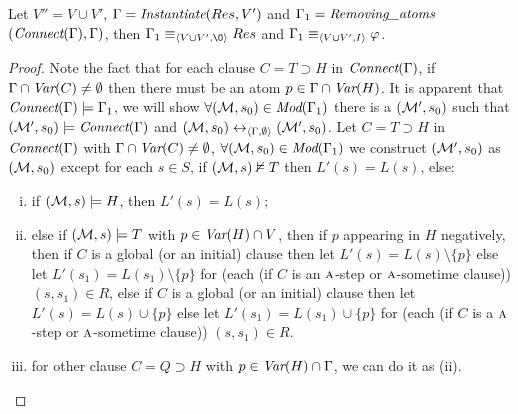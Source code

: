 \documentclass[letterpaper]{article} %
\begin{document}
\begin{proposition}\label{pro:elm}
Let $V''=V \cup V'$, $\Gamma=\emph{Instantiate}(Res, V')$ and $\Gamma_1=\emph{Removing\_atoms}$ $(\emph{Connect}(\Gamma), \Gamma)$, then  $\Gamma_1\equiv_{\tuple{V\cup V', {\O}}} Res$ and $\Gamma_1 \equiv_{{\langle{V \cup V', I}\rangle}} \varphi$.
\end{proposition}
\begin{proof}
Note the fact that for each clause $C = T \supset H$ in $\emph{Connect}(\Gamma)$, if $\Gamma \cap \textit{Var}(C) \neq \emptyset$ then there must be an atom $p\in \Gamma \cap \textit{Var}(H)$. It is apparent that $\emph{Connect}(\Gamma) \models \Gamma_1$, we will show $\forall ({\cal M}, s_0) \in \textit{Mod}(\Gamma_1)$ there is a $({\cal M}', s_0)$ such that $({\cal M}', s_0) \models \emph{Connect}(\Gamma)$ and $({\cal M}, s_0) \leftrightarrow_{{\langle{\Gamma, \emptyset}\rangle}} ({\cal M}', s_0)$.
Let $C = T \supset H$ in $\emph{Connect}(\Gamma)$ with $\Gamma \cap \textit{Var}(C) \neq \emptyset$,
$\forall ({\cal M}, s_0) \in \textit{Mod}(\Gamma_1)$ we construct $({\cal M}', s_0)$ as $({\cal M}, s_0)$ except
 for each $s\in S$, if $({\cal M}, s) \nvDash T$ then $L'(s) = L(s)$, else:
\begin{enumerate}[(i)]
  \item if $({\cal M},s) \models H$, then $L'(s) = L(s)$;
  \item else if $({\cal M}, s) \models T$ with $p \in \textit{Var}(H)\cap V$, then if $p$ appearing in $H$ negatively, then if $C$ is a global (or an initial) clause then let $L'(s) = L(s) \setminus \{p\}$ else let $L'(s_1) = L(s_1) \setminus \{p\}$ for (each (if $C$ is an $\textsc{a}$-step or $\textsc{a}$-sometime clause)) $(s,s_1) \in R$, else if $C$ is a global (or an initial) clause then let $L'(s) = L(s) \cup \{p\}$ else let $L'(s_1) = L(s_1) \cup \{p\}$ for (each (if $C$ is a $\textsc{a}$-step or $\textsc{a}$-sometime clause)) $(s,s_1) \in R$.
  \item for other clause $C=Q\supset H$ with $p\in \textit{Var}(H)\cap \Gamma$, we can do it as (ii).
\end{enumerate}


\end{proof}
\end{document}
